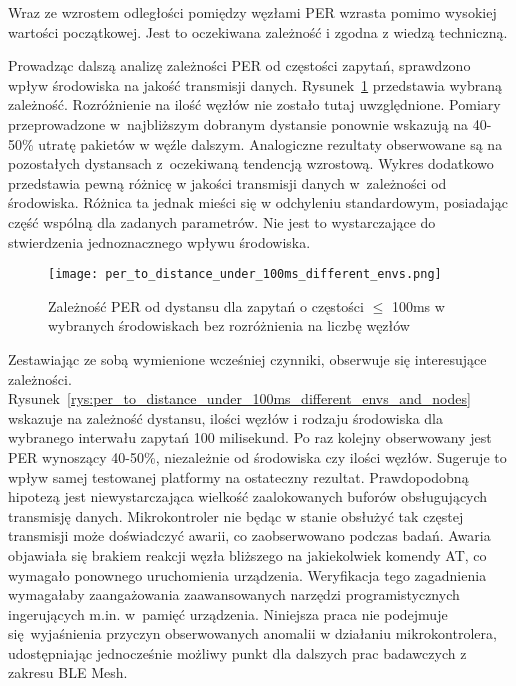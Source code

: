 Wraz ze wzrostem odległości pomiędzy węzłami PER wzrasta pomimo wysokiej wartości początkowej. Jest to 
oczekiwana zależność i zgodna z wiedzą techniczną.

Prowadząc dalszą analizę zależności PER od częstości zapytań, sprawdzono wpływ środowiska na jakość transmisji danych.
Rysunek~\ref{rys:per_to_distance_under_100ms_different_envs} przedstawia wybraną zależność. Rozróżnienie
na ilość węzłów nie zostało tutaj uwzględnione. Pomiary przeprowadzone w~najbliższym dobranym dystansie ponownie 
wskazują na 40-50\% utratę pakietów w węźle dalszym. Analogiczne rezultaty obserwowane są na pozostałych dystansach 
z~oczekiwaną tendencją wzrostową.
Wykres dodatkowo przedstawia pewną różnicę w jakości transmisji danych w~zależności od środowiska. Różnica ta 
jednak mieści się w odchyleniu standardowym, posiadając część wspólną dla zadanych parametrów. Nie jest to 
wystarczające do stwierdzenia jednoznacznego wpływu środowiska.

\begin{figure}[!htb]
	\centering \texttt{[image: per\_to\_distance\_under\_100ms\_different\_envs.png]} 
	\caption{Zależność \gls{PER} od dystansu dla zapytań o częstości $\leqslant$ 100ms w wybranych środowiskach bez rozróżnienia na liczbę węzłów}
	\label{rys:per_to_distance_under_100ms_different_envs}
\end{figure}

Zestawiając ze sobą wymienione wcześniej czynniki, obserwuje się interesujące zależności. Rysunek~\ref{rys:per_to_distance_under_100ms_different_envs_and_nodes} wskazuje na zależność dystansu, ilości węzłów i rodzaju
środowiska dla wybranego interwału zapytań 100 milisekund. Po raz kolejny obserwowany jest PER wynoszący
40-50\%, niezależnie od środowiska czy ilości węzłów. Sugeruje to wpływ samej testowanej platformy
na ostateczny rezultat. Prawdopodobną hipotezą jest niewystarczająca wielkość zaalokowanych
buforów obsługujących transmisję danych. Mikrokontroler nie będąc w stanie obsłużyć tak częstej transmisji
może doświadczyć awarii, co zaobserwowano podczas badań. Awaria objawiała się brakiem reakcji węzła bliższego
na jakiekolwiek komendy AT, co wymagało ponownego uruchomienia urządzenia. Weryfikacja tego zagadnienia
wymagałaby zaangażowania zaawansowanych narzędzi programistycznych ingerujących m.in. w~pamięć urządzenia.
Niniejsza praca nie podejmuje się wyjaśnienia przyczyn obserwowanych anomalii w działaniu mikrokontrolera,
udostępniając jednocześnie możliwy punkt dla dalszych prac badawczych z zakresu BLE Mesh.

